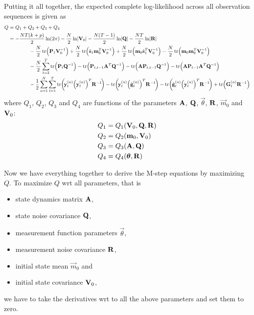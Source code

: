	Putting it all together, the expected complete log-likelihood across all observation sequences is given as
	\begin{align*}
		Q
			&= Q_1 + Q_2 + Q_3 + Q_4 \\
			&= -\frac{NT(k + p)}{2} \ln(2\pi) - \frac{N}{2} \ln \lvert \mat{V}_0 \rvert - \frac{N(T - 1)}{2} \ln \lvert \mat{Q} \rvert - \frac{NT}{2} \ln \lvert \mat{R} \rvert \\
				&\qquad\qquad -\frac{N}{2} \tr\!\Big( \mat{P}_1 \mat{V}_0^{-1} \Big) + \frac{N}{2} \tr\!\Big( \hat{\vec{s}}_1 \vec{m}_0^T \mat{V}_0^{-1} \Big) + \frac{N}{2} \tr\!\Big( \vec{m}_0 \hat{\vec{s}}_1^T \mat{V}_0^{-1} \Big) - \frac{N}{2} \tr\!\Big(\vec{m}_0 \vec{m}_0^T \mat{V}_0^{-1} \Big) \\
				&\qquad\qquad -\frac{N}{2} \sum_{t = 2}^{T} \tr\!\Big( \mat{P}_t \mat{Q}^{-1} \Big) - \tr\!\Big( \mat{P}_{t, t - 1} \mat{A}^T \mat{Q}^{-1} \Big) - \tr\!\Big( \mat{A} \mat{P}_{t, t - 1} \mat{Q}^{-1} \Big) - \tr\!\Big( \mat{A} \mat{P}_{t - 1} \mat{A}^T \mat{Q}^{-1} \Big) \\
				&\qquad\qquad -\frac{1}{2} \sum_{n = 1}^{N} \sum_{t = 1}^{T} \tr\!\bigg(\! \vec{y}_t^{(n)} \Big(\vec{y}_t^{(n)}\Big)^T \mat{R}^{-1} \!\bigg) - \tr\!\bigg(\! \vec{y}_t^{(n)} \Big(\hat{\vec{g}}_t^{(n)}\Big)^T \mat{R}^{-1} \!\bigg) - \tr\!\bigg(\! \hat{\vec{g}}_t^{(n)} \Big(\vec{y}_t^{(n)}\Big)^T \mat{R}^{-1} \!\bigg) + \tr\!\Big( \mat{G}_t^{(n)} \mat{R}^{-1} \Big)
	\end{align*}
	where \( Q_1 \), \( Q_2 \), \( Q_3 \) and \( Q_4 \) are functions of the parameters \( \boldsymbol{\mathrm{A}} \), \( \boldsymbol{\mathrm{Q}} \), \( \vec{\theta} \), \( \boldsymbol{\mathrm{R}} \), \( \vec{m}_0 \) and \( \boldsymbol{\mathrm{V}}_0 \):
	\begin{align*}
		Q_1 & = Q_1(\boldsymbol{\mathrm{V}}_0, \boldsymbol{\mathrm{Q}}, \boldsymbol{\mathrm{R}}) \\
		Q_2 & = Q_2(\boldsymbol{\mathrm{m}}_0, \boldsymbol{\mathrm{V}}_0)        \\
		Q_3 & = Q_3(\boldsymbol{\mathrm{A}}, \boldsymbol{\mathrm{Q}})            \\
		Q_4 & = Q_4(\boldsymbol{\mathrm{\theta}}, \boldsymbol{\mathrm{R}})
	\end{align*}

	Now we have everything together to derive the M-step equations by maximizing \(Q\). To maximize \(Q\) \ac{wrt} all parameters, that is
	\begin{itemize}
		\item state dynamics matrix \(\boldsymbol{\mathrm{A}}\),
		\item state noise covariance \(\boldsymbol{\mathrm{Q}}\),
		\item measurement function parameters \(\vec{\theta}\),
		\item measurement noise covariance \(\boldsymbol{\mathrm{R}}\),
		\item initial state mean \(\vec{m}_0\) and
		\item initial state covariance \(\boldsymbol{\mathrm{V}}_0\),
	\end{itemize}
	we have to take the derivatives \ac{wrt} to all the above parameters and set them to zero.
	
